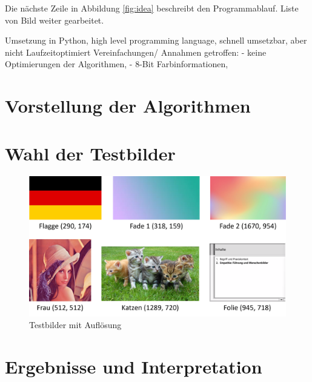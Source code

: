 \documentclass[conference]{IEEEtran}
\begin{document}
Die nächste Zeile in Abbildung \ref{fig:idea} beschreibt den Programmablauf.
Liste von Bild weiter gearbeitet.








Umsetzung in Python, high level programming language, schnell umsetzbar, aber nicht
Laufzeitoptimiert
Vereinfachungen/ Annahmen getroffen:
- keine Optimierungen der Algorithmen,
- 8-Bit Farbinformationen,




\section{Vorstellung der Algorithmen}


\section{Wahl der Testbilder}

\begin{figure}[h]
  \label{fig:testbilder}
  \centering
  \includegraphics[width=\columnwidth]{./images/Images.png}
  \caption{Testbilder mit Auflösung}
\end{figure}



\section{Ergebnisse und Interpretation}
\end{document}
